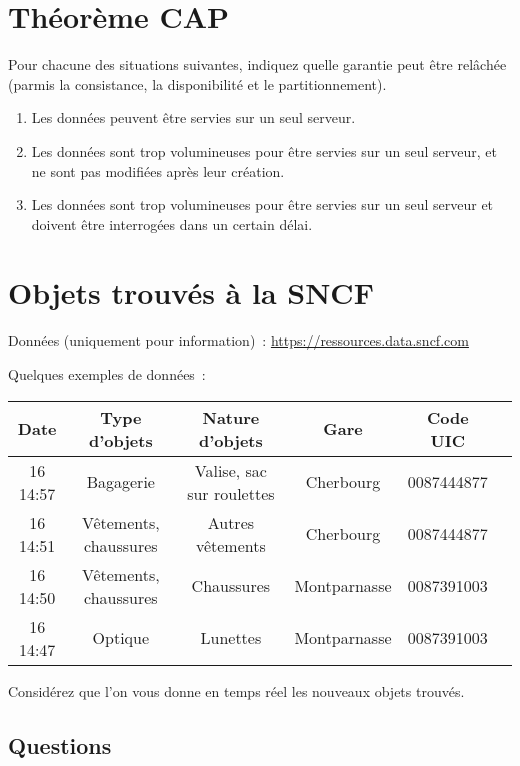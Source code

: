\documentclass[12pt,letterpaper]{article}
\begin{document}
\section*{Théorème CAP}

Pour chacune des situations suivantes, indiquez quelle garantie peut être relâchée (parmis la consistance, la disponibilité et le partitionnement).

\begin{enumerate}
\item Les données peuvent être servies sur un seul serveur.
\item Les données sont trop volumineuses pour être servies sur un seul serveur, et ne sont pas modifiées après leur création.
\item Les données sont trop volumineuses pour être servies sur un seul serveur et doivent être interrogées dans un certain délai.
\end{enumerate}

\section*{Objets trouvés à la SNCF}

Données (uniquement pour information)~: \url{https://ressources.data.sncf.com}

Quelques exemples de données~:

\begin{tabular}{| c | c | c | c | c | c |}
\hline
Date & Type d'objets & Nature d'objets & Gare & Code UIC \\ \hline
16 14:57 & Bagagerie & Valise, sac sur roulettes & Cherbourg & 0087444877 \\ \hline
16 14:51 & Vêtements, chaussures & Autres vêtements & Cherbourg & 0087444877 \\ \hline
16 14:50 & Vêtements, chaussures & Chaussures & Montparnasse & 0087391003 \\ \hline
16 14:47 & Optique & Lunettes & Montparnasse & 0087391003 \\ \hline
\end{tabular}

Considérez que l'on vous donne en temps réel les nouveaux objets trouvés.

\subsection*{Questions}
\end{document}
